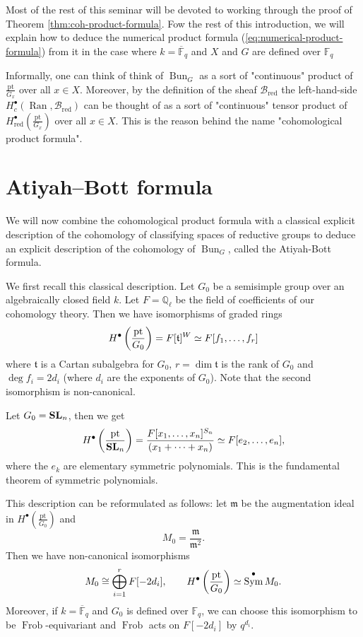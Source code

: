 \documentclass[oneside]{amsart}
\newcommand{\Bred}{\mathcal{B}_\text{red}}
\newcommand{\tf}{\mathfrak{t}}
\newcommand{\F}{\mathbb{F}}
\DeclareMathOperator{\Bun}{Bun}
\DeclareMathOperator{\Frob}{Frob}
\DeclareMathOperator{\Ran}{Ran}
\newcommand{\red}{_{\mathrm{red}}}
\newcommand{\km}{\mathfrak{m}}
\DeclareMathOperator{\Sym}{Sym}
\begin{document}
Most of the rest of this seminar will be devoted to working through the proof of Theorem \ref{thm:coh-product-formula}. Fow the rest of this introduction, we will explain how to deduce the numerical product formula (\ref{eq:numerical-product-formula}) from it in the case where $k=\overline{\F}_q$ and $X$ and $G$ are defined over $\F_q$

\begin{remark}
    Informally, one can think of think of $\Bun_G$ as a sort of "continuous" product of $\frac{\text{pt}}{G_x}$ over all $x\in X$. Moreover, by the definition of the sheaf $\Bred$ the left-hand-side $H_c^{\bullet}(\Ran,\Bred)$ can be thought of as a sort of "continuous" tensor product of $H\red^{\bullet}\left( \frac{\text{pt}}{G_{x}}\right)$ over all $x\in X$. This is the reason behind the name "cohomological product formula".
\end{remark}

\section{Atiyah--Bott formula}

We will now combine the cohomological product formula with a classical explicit description of the cohomology of classifying spaces of reductive groups to deduce an explicit description of the cohomology of $\Bun_G$, called the Atiyah-Bott formula.

We first recall this classical description. Let $G_0$ be a semisimple group over an algebraically closed field $k$. Let $F=\mathbb{Q}_\ell$ be the field of coefficients of our cohomology theory. Then we have isomorphisms of graded rings
\[
	H^{\bullet}\left( \frac{\text{pt}}{G_0} \right) = F[\tf]^{W} \isoto F[f_1,\dots,f_r]
\] 
where $\tf$ is a Cartan subalgebra for $G_0$, $r=\dim \tf$ is the rank of $G_0$ and $\deg f_i = 2d_i$ (where $d_i$ are the exponents of $G_0$). Note that the second isomorphism is non-canonical.
\begin{example}
	Let $G_0 = \mathbf{SL}_n$, then we get
	\[
		H^\bullet\left(\frac{\text{pt}}{\mathbf{SL}_n} \right) = \frac{F[x_1,\dots,x_n]^{S_n}}{(x_1+\dots+x_n)} \simeq F[e_2,\dots,e_n],
	\] 
    where the $e_k$ are elementary symmetric polynomials. This is the fundamental theorem of symmetric polynomials.
\end{example}

This description can be reformulated as follows: let $\km$ be the augmentation ideal in $H^{\bullet}\left( \frac{\text{pt}}{G_0} \right) $ and
\[
M_0 = \frac{\km}{\km^2}.
\] 
Then we have non-canonical isomorphisms
\begin{equation} \label{eq:coh-pt/G}
	M_0 \cong \bigoplus_{i=1}^{r}F[-2d_i],\qquad H^{\bullet}\left( \frac{\text{pt}}{G_0} \right) \isoto \Sym^{\bullet}M_0.
\end{equation}
Moreover, if $k=\overline{\F}_q$ and $G_0$ is defined over $\F_q$, we can choose this isomorphism to be $\Frob$-equivariant and $\Frob$ acts on $F[-2d_i]$ by $q^{d_i}$.
\end{document}
